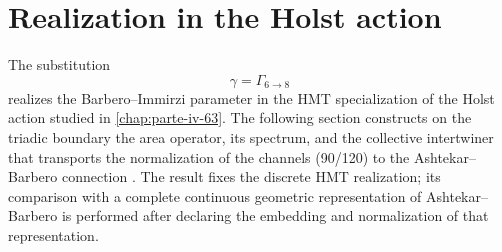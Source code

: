 \section{Realization in the Holst action}

The substitution
\[
 \gamma=\Gamma_{6\to8}
\]
realizes the Barbero--Immirzi parameter in the HMT specialization of the
Holst action studied in \cref{chap:parte-iv-63}. The following section
constructs on the triadic boundary the area operator, its spectrum, and the
collective intertwiner that transports the normalization of the channels
(90/120) to the Ashtekar--Barbero connection
\cite{Barbero1995,Immirzi1997,Holst1996}. The result fixes the discrete HMT realization; its comparison
with a complete continuous geometric representation of Ashtekar--Barbero
is performed after declaring the embedding and normalization of that representation.
